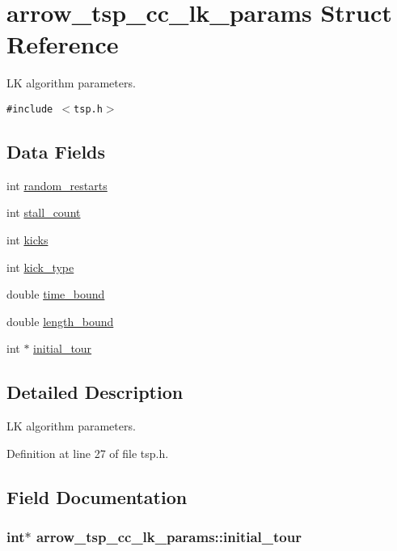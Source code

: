 \hypertarget{structarrow__tsp__cc__lk__params}{
\section{arrow\_\-tsp\_\-cc\_\-lk\_\-params Struct Reference}
\label{structarrow__tsp__cc__lk__params}
}
LK algorithm parameters.  


{\tt \#include $<$tsp.h$>$}

\subsection*{Data Fields}
\begin{CompactItemize}
\item 
int \hyperlink{structarrow__tsp__cc__lk__params_291c8a0ec4208ae75229c223dcf1160a}{random\_\-restarts}
\item 
int \hyperlink{structarrow__tsp__cc__lk__params_dee46e401d6f6eca9f9a0d1f376c6ebe}{stall\_\-count}
\item 
int \hyperlink{structarrow__tsp__cc__lk__params_5912b1978195270052497e56d8dbffae}{kicks}
\item 
int \hyperlink{structarrow__tsp__cc__lk__params_d5973ec2e377d3526911cfbc8deb2e47}{kick\_\-type}
\item 
double \hyperlink{structarrow__tsp__cc__lk__params_d4a71865c09d0624395d5a71b46bf8d5}{time\_\-bound}
\item 
double \hyperlink{structarrow__tsp__cc__lk__params_47292f99c63b9db5bad901b5aa5e42a1}{length\_\-bound}
\item 
int $\ast$ \hyperlink{structarrow__tsp__cc__lk__params_1093ecf5b1b8f5d198740bbaad77d4a2}{initial\_\-tour}
\end{CompactItemize}


\subsection{Detailed Description}
LK algorithm parameters. 

Definition at line 27 of file tsp.h.

\subsection{Field Documentation}
\hypertarget{structarrow__tsp__cc__lk__params_1093ecf5b1b8f5d198740bbaad77d4a2}{
\subsubsection[{initial\_\-tour}]{\setlength{\rightskip}{0pt plus 5cm}int$\ast$ {\bf arrow\_\-tsp\_\-cc\_\-lk\_\-params::initial\_\-tour}}}
\label{structarrow__tsp__cc__lk__params_1093ecf5b1b8f5d198740bbaad77d4a2}


